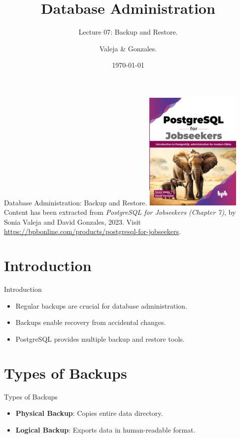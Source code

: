 \documentclass[aspectratio=169]{beamer}
\title[Backup / Restore]{Database Administration}
\subtitle{Lecture 07: Backup and Restore.}
\author{Valeja \& Gonzales.}
\date{\today}
\begin{document}
\frame{\titlepage}

\begin{frame}{Database Administration: Backup and Restore.}
    \centering
    \includegraphics[width=0.35\textwidth]{figures/book_cover}\\
    \vspace{2mm}
    {
        \scriptsize
        Content has been extracted from \textit{PostgreSQL for Jobseekers (Chapter 7)}, by Sonia Valeja and David Gonzales, 2023.  Visit \url{https://bpbonline.com/products/postgresql-for-jobseekers}.\\
    }
\end{frame}

\section{Introduction}

\begin{frame}{Introduction}
    \begin{itemize}
        \item Regular backups are crucial for database administration.
        \item Backups enable recovery from accidental changes.
        \item PostgreSQL provides multiple backup and restore tools.
    \end{itemize}
\end{frame}

\section{Types of Backups}

\begin{frame}{Types of Backups}
    \begin{itemize}
        \item \textbf{Physical Backup}: Copies entire data directory.
        \item \textbf{Logical Backup}: Exports data in human-readable format.
    \end{itemize}
\end{frame}
\end{document}
